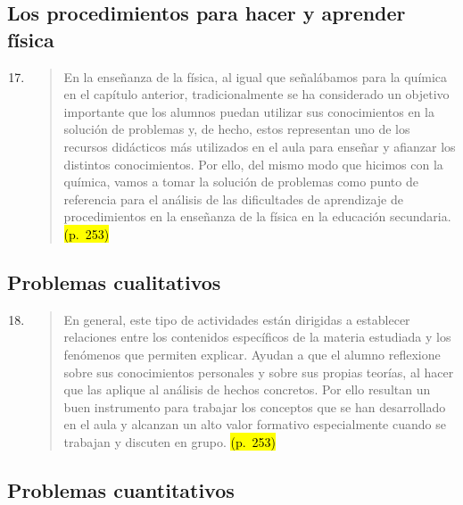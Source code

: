\documentclass{article}
\begin{document}
\subsection*{Los procedimientos para hacer y aprender física}

\begin{enumerate}
  \setcounter{enumi}{16}
  \item
  \begin{quote}
  En la enseñanza de la física, al igual que señalábamos para la química en el capítulo anterior, tradicionalmente se ha considerado un objetivo importante que los alumnos puedan utilizar sus conocimientos en la solución de problemas y, de hecho, estos representan uno de los recursos didácticos más utilizados en el aula para enseñar y afianzar los distintos conocimientos. Por ello, del mismo modo que hicimos con la química, vamos a tomar la solución de problemas como punto de referencia para el análisis de las dificultades de aprendizaje de procedimientos en la enseñanza de la física en la educación secundaria. \hl{(p.~253)}
  \end{quote}
\end{enumerate}

\subsection*{Problemas cualitativos}

\begin{enumerate}
  \setcounter{enumi}{17}
  \item
  \begin{quote}
  En general, este tipo de actividades están dirigidas a establecer relaciones entre los contenidos específicos de la materia estudiada y los fenómenos que permiten explicar. Ayudan a que el alumno reflexione sobre sus conocimientos personales y sobre sus propias teorías, al hacer que las aplique al análisis de hechos concretos. Por ello resultan un buen instrumento para trabajar los conceptos que se han desarrollado en el aula y alcanzan un alto valor formativo especialmente cuando se trabajan y discuten en grupo. \hl{(p.~253)}
  \end{quote}
\end{enumerate}


\subsection*{Problemas cuantitativos}
\end{document}
